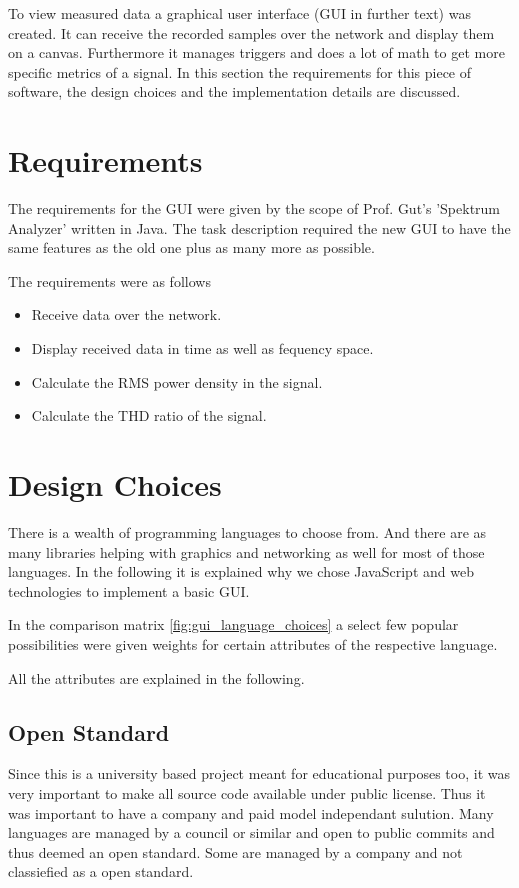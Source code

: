 To view measured data a graphical user interface (GUI in further text) was created. It can receive the recorded samples over the network and display them on a canvas. Furthermore it manages triggers and does a lot of math to get more specific metrics of a signal.
In this section the requirements for this piece of software, the design choices and the implementation details are discussed.

\section{Requirements}

The requirements for the GUI were given by the scope of Prof. Gut's 'Spektrum Analyzer' written in Java.
The task description required the new GUI to have the same features as the old one plus as many more as possible.

The requirements were as follows

\begin{itemize}
    \item Receive data over the network.
    \item Display received data in time as well as fequency space.
    \item Calculate the RMS power density in the signal.
    \item Calculate the THD ratio of the signal.
\end{itemize}

\section{Design Choices}

There is a wealth of programming languages to choose from. And there are as many libraries helping with graphics and networking as well for most of those languages.
In the following it is explained why we chose JavaScript and web technologies to implement a basic GUI.

In the comparison matrix \ref{fig:gui_language_choices} a select few popular possibilities were given weights for certain attributes of the respective language.

All the attributes are explained in the following.

\subsection*{Open Standard} Since this is a university based project meant for educational purposes too, it was very important to make all source code available under public license. Thus it was important to have a company and paid model independant sulution. Many languages are managed by a council or similar and open to public commits and thus deemed an open standard. Some are managed by a company and not classiefied as a open standard.

